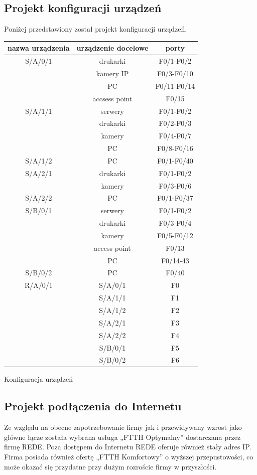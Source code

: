 \documentclass{article}
\begin{document}
\subsection{Projekt konfiguracji urządzeń}
Poniżej przedstawiony został projekt konfiguracji urządzeń.
\begin{Tabela}[!ht]
	\centering
	\begin{tabular}{c|c|c}
		nazwa urządzenia & urządzenie docelowe &porty\\
		\hline	
		S/A/0/1 &	drukarki&	F0/1-F0/2\\
		&kamery IP	&F0/3-F0/10\\
		&PC	&F0/11-F0/14\\
		&accsess point&	F0/15\\
		\hline
		
		S/A/1/1&	serwery&	F0/1-F0/2\\
		&drukarki&	F0/2-F0/3\\
		&kamery&	F0/4-F0/7\\
		&PC&	F0/8-F0/16\\
		\hline
		
		S/A/1/2	&PC&	F0/1-F0/40\\
		\hline
		
		S/A/2/1&	drukarki&	F0/1-F0/2\\
		&kamery&F0/3-F0/6\\
		\hline
		
		S/A/2/2&	PC	&F0/1-F0/37\\
		\hline
		
		S/B/0/1	&serwery	&F0/1-F0/2\\
		&drukarki&	F0/3-F0/4\\
		&kamery	&F0/5-F0/12\\
		&access point&	F0/13\\
		&PC	&F0/14-43\\
		\hline
		
		S/B/0/2	&PC	&F0/40\\
		\hline
		R/A/0/1&S/A/0/1&F0\\
		&S/A/1/1&F1\\
		&S/A/1/2&F2\\
		&S/A/2/1&F3\\
		&S/A/2/2&F4\\
		&S/B/0/1&F5\\
		&S/B/0/2&F6\\
		\hline
	\end{tabular}
\caption{Konfiguracja urządzeń}
\end{Tabela}
	
\subsection{Projekt podłączenia do Internetu}
Ze względu na obecne zapotrzebowanie firmy jak i przewidywany wzrost jako główne łącze została wybrana usługa „FTTH Optymalny” dostarczana przez firmę REDE.  Poza dostępem do Internetu REDE oferuje również stały adres IP. Firma posiada również ofertę „FTTH Komfortowy” o wyższej przepustowości, co może okazać się przydatne przy dużym rozroście firmy w przyszłości.
\end{document}
